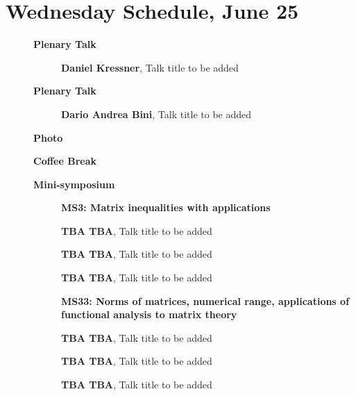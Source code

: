 \documentclass[ILAS2025-program.tex]{subfiles}
\begin{document}
\section{Wednesday Schedule, June 25}
    
    \begin{description}
    \item[] \textbf{Plenary Talk} 
    \begin{description}
        \item[] \textbf{Daniel Kressner}, Talk title to be added
        \end{description}
        \item[] \textbf{Plenary Talk} 
    \begin{description}
        \item[] \textbf{Dario Andrea Bini}, Talk title to be added
        \end{description}
        \item[] \textbf{Photo} 
    \item[] \textbf{Coffee Break} 
    \item[] \textbf{Mini-symposium} 
    \begin{description}
    \item[] \textbf{MS3: Matrix inequalities with applications} 
    \item[] \textbf{TBA TBA}, Talk title to be added
        \item[] \textbf{TBA TBA}, Talk title to be added
        \item[] \textbf{TBA TBA}, Talk title to be added
        \end{description}
    \begin{description}
    \item[] \textbf{MS33: Norms of matrices, numerical range, applications of functional analysis to matrix theory} 
    \item[] \textbf{TBA TBA}, Talk title to be added
        \item[] \textbf{TBA TBA}, Talk title to be added
        \item[] \textbf{TBA TBA}, Talk title to be added

\end{description}
\end{description}
\end{document}
